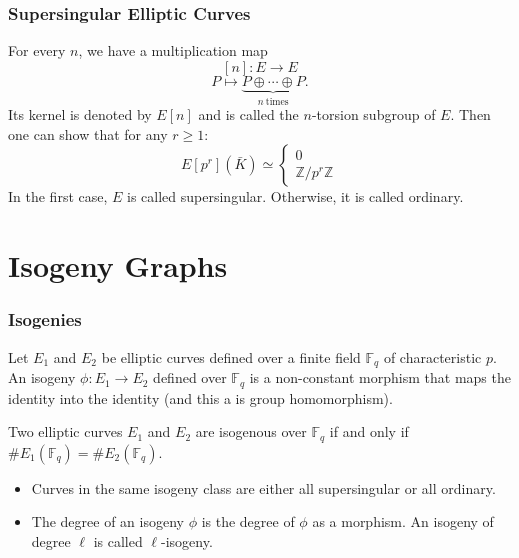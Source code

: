 \documentclass{beamer}
\begin{document}
\begin{frame}
\frametitle{Supersingular Elliptic Curves}
	\begin{definition}
		For every $n$, we have a multiplication map 
			\[[n]: E \to E\]
			\[ P \mapsto \underbrace{P \oplus \cdots \oplus P}_{n \ \text{times}}. \]
		Its kernel is denoted by $E[n]$ and is called the $n$-torsion subgroup of $E$. Then one can show that for any $r \geq 1$:
			\[ E[p^r](\bar{K}) \simeq
				\begin{cases}
					{0} \\
					\mathbb{Z}/p^r\mathbb{Z}
				\end{cases} \]
		In the first case, $E$ is called \alert{supersingular}. Otherwise, it is called ordinary.
	\end{definition}
\end{frame}

\section{Isogeny Graphs}

\begin{frame}
\frametitle{Isogenies}
	\begin{definition}
		Let $E_1$ and $E_2$ be elliptic curves defined over a finite field $\mathbb{F}_q$ of characteristic $p$. An \alert{isogeny} $\phi: E_1 \to E_2$ defined over $\mathbb{F}_q$ is a non-constant morphism that maps the identity into the identity (and this a is group homomorphism).
	\end{definition}
	
	\begin{theorem}
		Two elliptic curves $E_1$ and $E_2$ are isogenous over $\mathbb{F}_q$ if and only if $\#E_1(\mathbb{F}_q) = \#E_2(\mathbb{F}_q)$. 
	\end{theorem}

	\begin{itemize}
		\item Curves in the same isogeny class are either all supersingular or all ordinary.
		
		\item The degree of an isogeny $\phi$ is the degree of $\phi$ as a morphism. An isogeny of degree $\ell$ is called $\ell$-isogeny.
	\end{itemize}
\end{frame}
\end{document}
